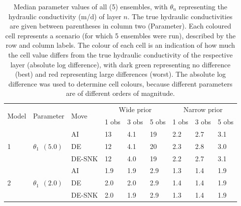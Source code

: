 \begin{table}[ht]
\centering
\caption{Median parameter values of all (5) ensembles, with $\theta_n$ representing the hydraulic conductivity (m/d) of layer $n$. The true hydraulic conductivities are given between parentheses in column two (Parameter). Each coloured cell represents a scenario (for which 5 ensembles were run), described by the row and column labels. The colour of each cell is an indication of how much the cell value differs from the true hydraulic conductivity of the respective layer (absolute log difference), with dark green representing no difference (best) and red representing large differences (worst). The absolute log difference was used to determine cell colours, because different parameters are of different orders of magnitude.}
\label{tab_median_color}
\begin{tabularx}{\textwidth}{lllXXXXXX}
\toprule
\multirow{2}{*}{Model} & \multirow{2}{*}{Parameter} & \multirow{2}{*}{Move} & \multicolumn{3}{c}{Wide prior} & \multicolumn{3}{c}{Narrow prior} \\
\cmidrule(lr){4-6} \cmidrule(lr){7-9}
& & & 1 obs & 3 obs & 5 obs & 1 obs & 3 obs & 5 obs \\
\midrule
\multirow{3}{*}{1} & \multirow{3}{*}{$\theta_1 \:\: (5.0)$} & AI & 13 \cellcolor[HTML]{C8E300} & 4.1 \cellcolor[HTML]{289300} & 19 \cellcolor[HTML]{FFE400} & 2.2 \cellcolor[HTML]{A8D300} & 2.7 \cellcolor[HTML]{80BF00} & 3.1 \cellcolor[HTML]{61B000} \\
& & DE & 12 \cellcolor[HTML]{C0DF00} & 4.1 \cellcolor[HTML]{2A9400} & 20 \cellcolor[HTML]{FFD800} & 2.3 \cellcolor[HTML]{A6D200} & 2.8 \cellcolor[HTML]{79BC00} & 3.0 \cellcolor[HTML]{68B300} \\
& & DE-SNK & 12 \cellcolor[HTML]{BCDD00} & 4.0 \cellcolor[HTML]{2C9500} & 19 \cellcolor[HTML]{FFE800} & 2.2 \cellcolor[HTML]{A8D300} & 2.7 \cellcolor[HTML]{7EBE00} & 3.1 \cellcolor[HTML]{64B100} \\
\cmidrule(lr){1-3} \cmidrule(lr){4-6} \cmidrule(lr){7-9}
\multirow{6}{*}{2} & \multirow{3}{*}{$\theta_1 \:\: (2.0)$} & AI & 1.9 \cellcolor[HTML]{0A8400} & 1.9 \cellcolor[HTML]{0E8600} & 2.9 \cellcolor[HTML]{49A400} & 1.3 \cellcolor[HTML]{54A900} & 1.4 \cellcolor[HTML]{41A000} & 1.9 \cellcolor[HTML]{068200} \\
& & DE & 2.0 \cellcolor[HTML]{008000} & 2.0 \cellcolor[HTML]{008000} & 2.9 \cellcolor[HTML]{4CA500} & 1.4 \cellcolor[HTML]{4EA600} & 1.4 \cellcolor[HTML]{46A200} & 1.9 \cellcolor[HTML]{068200} \\
& & DE-SNK & 2.0 \cellcolor[HTML]{008000} & 1.9 \cellcolor[HTML]{088300} & 2.9 \cellcolor[HTML]{4CA500} & 1.3 \cellcolor[HTML]{51A800} & 1.4 \cellcolor[HTML]{44A100} & 1.9 \cellcolor[HTML]{088300} \\

\end{tabularx}
\end{table}
